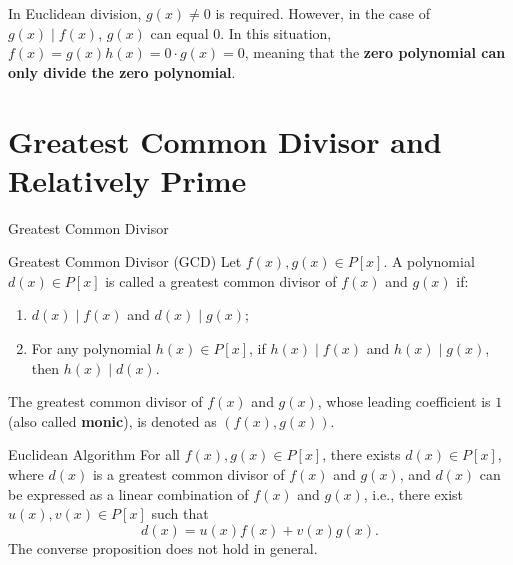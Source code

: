 \documentclass[11pt]{elegantbook}
\begin{document}
\begin{property}
    
\end{property}

\begin{caution}
    In Euclidean division, \( g(x) \neq 0 \) is required. 
    However, in the case of \( g(x) \mid f(x) \), \( g(x) \) can equal \( 0 \). 
    In this situation, \( f(x) = g(x)h(x) = 0 \cdot g(x) = 0 \), 
    meaning that the \textbf{zero polynomial can only divide the zero polynomial}.
\end{caution}

\section{Greatest Common Divisor and Relatively Prime}
\begin{leftbarTitle}{Greatest Common Divisor}\end{leftbarTitle}
\begin{definition}{Greatest Common Divisor (GCD)}
    Let \( f(x), g(x) \in P[x] \). 
    A polynomial \( d(x) \in P[x] \) is called a greatest common divisor of \( f(x) \) and \( g(x) \) if:
    \begin{enumerate}
        \item \( d(x) \mid f(x) \) and \( d(x) \mid g(x) \);
        \item For any polynomial \( h(x) \in P[x] \), 
            if \( h(x) \mid f(x) \) and \( h(x) \mid g(x) \), then \( h(x) \mid d(x) \).
    \end{enumerate}
    The greatest common divisor of \( f(x) \) and \( g(x) \), 
    whose leading coefficient is \(1\) (also called \textbf{monic}), is denoted as \( \left(f(x), g(x)\right) \).
\end{definition}

\begin{property}
    
\end{property}

\begin{theorem}{Euclidean Algorithm}
    For all \( f(x), g(x) \in P[x] \), there exists \( d(x) \in P[x] \), 
    where \( d(x) \) is a greatest common divisor of \( f(x) \) and \( g(x) \), 
    and \( d(x) \) can be expressed as a linear combination of \( f(x) \) and \( g(x) \), 
    i.e., there exist \( u(x), v(x) \in P[x] \) such that
    \[
    d(x) = u(x)f(x) + v(x)g(x).
    \]
    The converse proposition does not hold in general.
\end{theorem}
\end{document}

